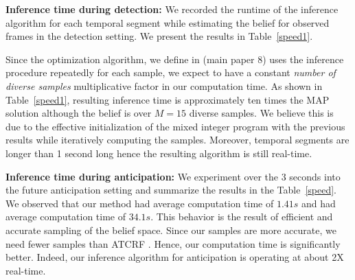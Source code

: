 \documentclass[conference]{IEEEtran}
\begin{document}
\noindent\textbf{Inference time during detection:}
We recorded the runtime of the inference algorithm for each temporal segment while estimating the belief for observed frames in the detection setting. We present the results in Table~\ref{speed1}.

Since the optimization algorithm, we define in (main paper 8) uses the inference procedure repeatedly for each sample, we expect to have a constant \emph{number of diverse samples} multiplicative factor in our computation time. As shown in Table~\ref{speed1}, resulting inference time is approximately ten times the MAP solution although the belief is over $M=15$ diverse samples. We believe this is due to the effective initialization of the mixed integer program with the previous results while iteratively computing the samples. Moreover, temporal segments are longer than 1 second long hence the resulting algorithm is still real-time.
\begin{table}[h!]
  \centering
  \vspace{-2mm}
\caption{Computation time for computing a belief over $M=15$ samples per temporal segment excluding pre-processing.}
\vspace{-2mm}
  \vspace{-1mm}
  \label{speed1}
\end{table}

\noindent\textbf{Inference time during anticipation:}
We experiment over the 3 seconds into the future anticipation setting and summarize the results in the Table~\ref{speed}. We observed that our method had average computation time of $1.41s$ and \cite{hemaAnt} had average computation time of $34.1s$. This behavior is the result of efficient and accurate sampling of the belief space. Since our samples are more accurate, we need fewer samples than ATCRF \cite{hemaAnt}. Hence, our computation time is significantly better. Indeed, our inference algorithm for anticipation is operating at about 2X real-time.
\begin{table}[h!]
  \centering
  \vspace{-2mm}
\caption{Computation time for anticipating 3 seconds in the future excluding pre-processing.}
\vspace{-2mm}
  \vspace{-1mm}
  \label{speed}
\end{table}
\end{document}
